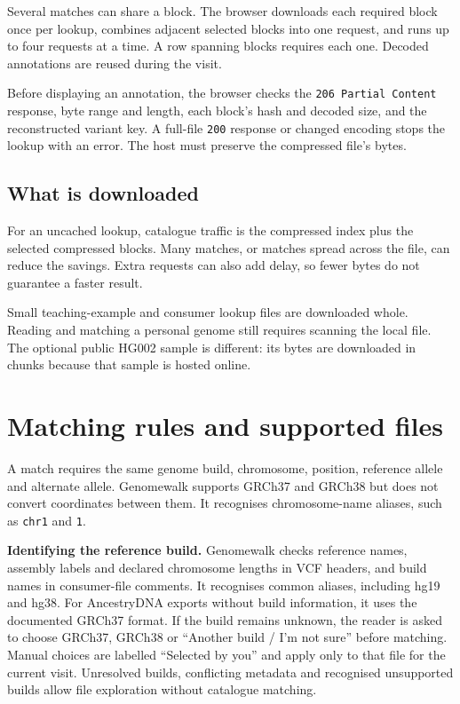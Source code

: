 \documentclass[10pt,twocolumn,letterpaper]{article}
\newcommand{\code}[1]{\texttt{\small #1}}
\begin{document}
Several matches can share a block. The browser downloads each required block once per lookup, combines adjacent selected blocks into one request, and runs up to four requests at a time. A row spanning blocks requires each one. Decoded annotations are reused during the visit.

Before displaying an annotation, the browser checks the \code{206 Partial Content} response, byte range and length, each block's hash and decoded size, and the reconstructed variant key. A full-file \code{200} response or changed encoding stops the lookup with an error. The host must preserve the compressed file's bytes.

\subsection{What is downloaded}
For an uncached lookup, catalogue traffic is the compressed index plus the selected compressed blocks. Many matches, or matches spread across the file, can reduce the savings. Extra requests can also add delay, so fewer bytes do not guarantee a faster result.

Small teaching-example and consumer lookup files are downloaded whole. Reading and matching a personal genome still requires scanning the local file. The optional public HG002 sample is different: its bytes are downloaded in chunks because that sample is hosted online.

\section{Matching rules and supported files}
A match requires the same genome build, chromosome, position, reference allele and alternate allele. Genomewalk supports GRCh37 and GRCh38 but does not convert coordinates between them. It recognises chromosome-name aliases, such as \code{chr1} and \code{1}.

\textbf{Identifying the reference build.} Genomewalk checks reference names, assembly labels and declared chromosome lengths in VCF headers, and build names in consumer-file comments. It recognises common aliases, including hg19 and hg38. For AncestryDNA exports without build information, it uses the documented GRCh37 format. If the build remains unknown, the reader is asked to choose GRCh37, GRCh38 or ``Another build / I'm not sure'' before matching. Manual choices are labelled ``Selected by you'' and apply only to that file for the current visit. Unresolved builds, conflicting metadata and recognised unsupported builds allow file exploration without catalogue matching.
\end{document}
